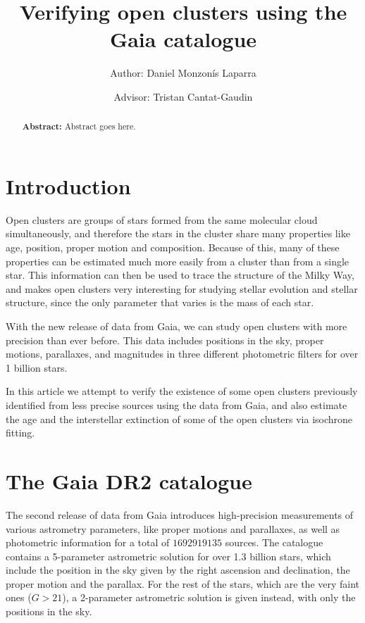 \documentclass[twocolumn]{revtex4}
\begin{document}
\pagestyle{fancy}


\title{Verifying open clusters using the Gaia catalogue}
\author{Author: Daniel Monzonís Laparra}
\author{Advisor: Tristan Cantat-Gaudin}

\begin{abstract}
{\bf Abstract:} Abstract goes here.
\end{abstract}

\maketitle



\section{Introduction}
Open clusters are groups of stars formed from the same molecular cloud simultaneously, and therefore the stars in the cluster share many properties like age, position, proper motion and composition. Because of this, many of these properties can be estimated much more easily from a cluster than from a single star. This information can then be used to trace the structure of the Milky Way, and makes open clusters very interesting for studying stellar evolution and stellar structure, since the only parameter that varies is the mass of each star.

With the new release of data from Gaia, we can study open clusters with more precision than ever before. This data includes positions in the sky, proper motions, parallaxes, and magnitudes in three different photometric filters for over 1 billion stars.

In this article we attempt to verify the existence of some open clusters previously identified from less precise sources using the data from Gaia, and also estimate the age and the interstellar extinction of some of the open clusters via isochrone fitting.

\section{The Gaia DR2 catalogue}
The second release of data from Gaia\cite{gaiadr2} introduces high-precision measurements of various astrometry parameters, like proper motions and parallaxes, as well as photometric information for a total of $1 692 919 135$ sources. The catalogue contains a 5-parameter astrometric solution for over 1.3 billion stars, which include the position in the sky given by the right ascension and declination, the proper motion and the parallax. For the rest of the stars, which are the very faint ones ($G > 21$), a 2-parameter astrometric solution is given instead, with only the positions in the sky.
\end{document}
